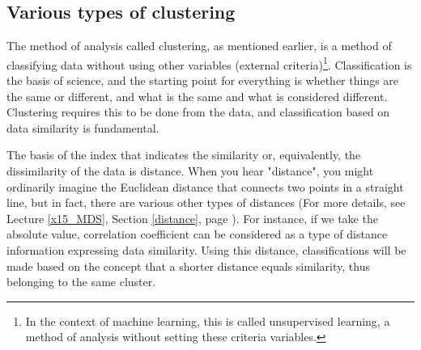 \documentclass{ltjsbook}
\begin{document}
\subsection{Various types of clustering}
The method of analysis called clustering, as mentioned earlier, is a method of classifying data without using other variables (external criteria)\footnote{In the context of machine learning, this is called unsupervised learning, a method of analysis without setting these criteria variables.}. Classification is the basis of science, and the starting point for everything is whether things are the same or different, and what is the same and what is considered different. Clustering requires this to be done from the data, and classification based on data similarity is fundamental.

The basis of the index that indicates the similarity or, equivalently, the dissimilarity of the data is distance. When you hear "distance", you might ordinarily imagine the Euclidean distance that connects two points in a straight line, but in fact, there are various other types of distances (For more details, see Lecture \ref{x15_MDS}, Section \ref{distance}, page \pageref{distance}). For instance, if we take the absolute value, correlation coefficient can be considered as a type of distance information expressing data similarity. Using this distance, classifications will be made based on the concept that a shorter distance equals similarity, thus belonging to the same cluster.
\end{document}

